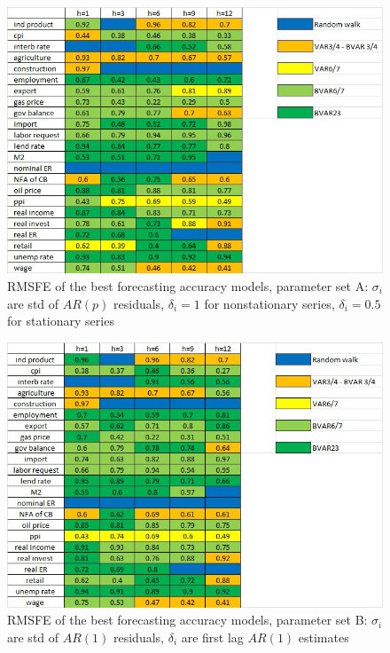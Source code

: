 \documentclass[12pt]{article} %
\begin{document}
\begin{figure}[!h]
\begin{center}
\includegraphics[scale=0.80]{hyper3.jpg}
\caption{RMSFE of the best forecasting accuracy models, parameter set A: $\sigma_i$ are std of $AR(p)$ residuals, $\delta_i=1$ for nonstationary series, $\delta_i=0.5$ for stationary series}
\label{fig:rmsfe1}
\end{center}
\end{figure}

\begin{figure}[!h]
\begin{center}
\includegraphics[scale=0.80]{hyper4.jpg}
\caption{RMSFE of the best forecasting accuracy models, parameter set B: $\sigma_i$ are std of $AR(1)$ residuals, $\delta_i$ are first lag $AR(1)$ estimates}
\label{fig:rmsfe2}
\end{center}
\end{figure}
\end{document}
